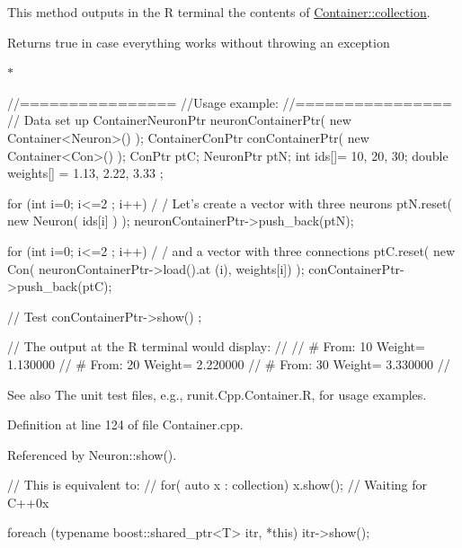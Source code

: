 This method outputs in the R terminal the contents of \hyperlink{class_container_a80e0663ccf6d358b15d0064d855a8e7b}{Container::collection}. \begin{DoxyReturn}{Returns}
true in case everything works without throwing an exception
\end{DoxyReturn}
$\ast$ 
\begin{DoxyCode}
                //================
                //Usage example:
                //================
                // Data set up
                        ContainerNeuronPtr      neuronContainerPtr( new 
      Container<Neuron>() );
                        ContainerConPtr conContainerPtr( new Container<Con>() );
                        ConPtr  ptC;
                        NeuronPtr ptN;
                        int ids[]= {10, 20, 30};
                        double weights[] = {1.13, 2.22, 3.33 };

                        for (int i=0; i<=2 ; i++) {                             /
      / Let's create a vector with three neurons
                                ptN.reset( new Neuron( ids[i] ) );
                                neuronContainerPtr->push_back(ptN);
                        }

                        for (int i=0; i<=2 ; i++) {                             /
      / and a vector with three connections
                                ptC.reset( new Con( neuronContainerPtr->load().at
      (i), weights[i]) );
                                conContainerPtr->push_back(ptC);
                        }

                // Test
                        conContainerPtr->show() ;

                // The output at the R terminal would display:
                //
                //      # From:  10      Weight=         1.130000
                //      # From:  20      Weight=         2.220000
                //      # From:  30      Weight=         3.330000
                //
\end{DoxyCode}


\begin{DoxySeeAlso}{See also}
The unit test files, e.g., runit.Cpp.Container.R, for usage examples. 
\end{DoxySeeAlso}


Definition at line 124 of file Container.cpp.



Referenced by Neuron::show().


\begin{DoxyCode}
  {

    // This is equivalent to:
    // for( auto x : collection)        { x.show(); }
    // Waiting for C++0x

foreach  (typename boost::shared_ptr<T> itr, *this)
    {
      itr->show();
    }
}
\end{DoxyCode}


